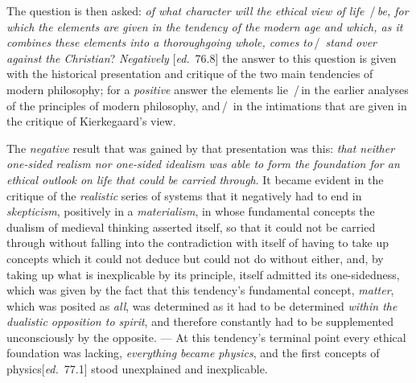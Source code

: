 \documentclass[12pt,a4paper,openany]{book}
\newcommand{\ed}[1]{{\small[\textit{ed.}\ #1]}}
\newcommand{\ins}[1]{\,/\,#1\,/\,}
\begin{document}
The question is then asked: \emph{of what character will the ethical view of life} \ins{\emph{be,
for which the elements are given in the tendency of the modern age and which, as it combines
these elements into a thoroughgoing whole, comes to}} \emph{stand over against the
Christian}? \emph{Negatively} \ed{76.8} the answer to this question is given with
the historical presentation and critique of the two main tendencies
of modern philosophy; for a \emph{positive} answer the elements lie \ins{in the earlier
analyses of the principles of modern philosophy, and} in the intimations
that are given in the critique of Kierkegaard's view.

The \emph{negative} result that was gained by that presentation was
this: \emph{that neither one-sided realism nor one-sided idealism was able to
form the foundation for an ethical outlook on life that could be carried through}. It became
evident in the critique of the \emph{realistic} series of systems that it
negatively had to end in \emph{skepticism}, positively in a \emph{materialism}, in whose fundamental concepts
the dualism of medieval thinking asserted itself,
so that it could not be carried through without falling into the
contradiction with itself of having to take up concepts which it could
not deduce but could not do without either, and, by taking up what is
inexplicable by its principle, itself admitted its one-sidedness, which was given
by the fact that this tendency's fundamental concept, \emph{matter}, which was posited as
\emph{all}, was determined as it had to be determined \emph{within the
dualistic opposition to spirit}, and therefore constantly had to be supplemented
unconsciously by the opposite. --- At this tendency's terminal point
every ethical foundation was lacking, \emph{everything became physics}, and the first concepts of physics\ed{77.1}
stood unexplained and inexplicable.
\end{document}

